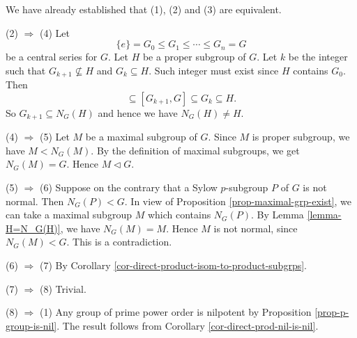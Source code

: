 \begin{sketch} We have already established that (1), (2) and (3) are equivalent.
	
 (2) $\Rightarrow$ (4) Let 
 \begin{equation*}
 	\{e\}= G_0 \leq G_1\leq \cdots \leq G_n = G
 \end{equation*} be a central series for $G$.   Let $H$ be a proper subgroup of $G$. Let $k$ be the integer such that $G_{k+1} \not\subseteq H$ and $G_{k} \subseteq H$. Such integer must exist since $H$ contains $G_0$. Then
 \begin{equation*}
 	[G_{k+1}, H] \subseteq [G_{k+1}, G] \subseteq G_{k} \subseteq H.
 \end{equation*}
 So $G_{k+1} \subseteq N_G(H)$ and hence we have $N_G(H) \neq H$.
 
	(4) $\Rightarrow$ (5) Let $M$ be a maximal subgroup of $G$. Since $M$ is proper subgroup, we have $M<N_G(M)$. By the definition of maximal subgroups, we get $N_G(M) = G$. Hence $M\lhd G$.
	
	(5) $\Rightarrow$ (6) Suppose on the contrary that a Sylow $p$-subgroup $P$ of $G$ is not normal. Then $N_G(P)< G$. In view of Proposition \ref{prop-maximal-grp-exist}, we can take a maximal subgroup $M$  which contains $N_G(P)$. By Lemma \ref{lemma-H=N_G(H)}, we have $N_G(M) = M$. Hence $M$ is not normal, since $N_G(M)<G$. This is a contradiction.
	
	(6) $\Rightarrow$ (7) By Corollary \ref{cor-direct-product-isom-to-product-subgrps}.
	
	(7) $\Rightarrow$ (8) Trivial.
	
	(8) $\Rightarrow$ (1) Any group of prime power order is nilpotent by Proposition \ref{prop-p-group-is-nil}. The result follows from Corollary \ref{cor-direct-prod-nil-is-nil}.
\end{sketch}



 

